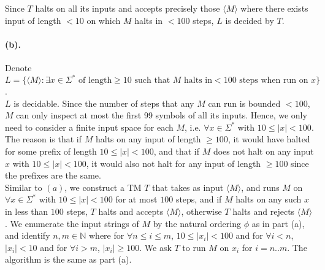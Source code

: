 \documentclass[12pt]{article}
\begin{document}
Since \(T\) halts on all its inputs and accepts precisely those \(\langle M \rangle\) where there exists input of length \(< 10\) on which \(M\) halts in \(< 100\) steps, \(L\) is decided by \(T\).

\paragraph*{(b).} Denote \(L = \{\langle M \rangle : \exists x \in \Sigma^* \text{ of length} \geq 10 \text{ such that } M \text{ halts in} < 100 \text{ steps when run on } x\}\).\\
\(L\) is decidable. Since the number of steps that any \(M\) can run is bounded \(< 100\), \(M\) can only inspect at most the first 99 symbols of all its inputs. Hence, we only need to consider a finite input space for each \(M\), i.e. \(\forall x \in \Sigma^*\) with \(10 \leq |x| < 100\). The reason is that if \(M\) halts on any input of length \(\geq 100\), it would have halted for some prefix of length \(10 \leq |x| < 100\), and that if \(M\) does not halt on any input \(x\) with \(10 \leq |x| < 100\), it would also not halt for any input of length \(\geq 100\) since the prefixes are the same. \\
Similar to \((a)\), we construct a TM \(T\) that takes as input \(\langle M \rangle\), and runs \(M\) on \(\forall x \in \Sigma^*\) with \(10 \leq |x| < 100\) for at most \(100\) steps, and if \(M\) halts on any such \(x\) in less than \(100\) steps, \(T\) halts and accepts \(\langle M \rangle\), otherwise \(T\) halts and rejects \(\langle M \rangle\). We enumerate the input strings of \(M\) by the natural ordering \(\phi\) as in part (a), and identify \(n, m \in \mathbb{N}\) where for \(\forall n\leq i \leq m\), \(10 \leq |x_i| < 100\) and for \(\forall i < n\), \(|x_i| < 10\) and for \(\forall i > m\), \(|x_i| \geq 100\). We ask \(T\) to run \(M\) on \(x_i\) for \(i = n .. m\). The algorithm is the same as part (a).
\end{document}

